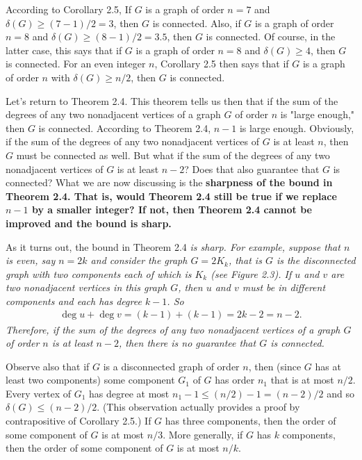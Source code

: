 According to Corollary 2.5, If $G$ is a graph of order $n = 7$ and $\delta(G) \geq (7-1)/2 = 3$, then $G$ is connected. Also, if $G$ is a graph of order $n=8$ and $\delta(G) \geq (8-1)/2 = 3.5$, then $G$ is connected. Of course, in the latter case, this says that if $G$ is a graph of order $n=8$ and $\delta(G) \geq 4$, then $G$ is connected. For an even integer $n$, Corollary 2.5 then says that if $G$ is a graph of order $n$ with $\delta(G) \geq n/2$, then $G$ is connected.

Let's return to Theorem 2.4. This theorem tells us then that if the sum of the degrees of any two nonadjacent vertices of a graph $G$ of order $n$ is "large enough," then $G$ is connected. According to Theorem 2.4, $n-1$ is large enough. Obviously, if the sum of the degrees of any two nonadjacent vertices of $G$ is at least $n$, then $G$ must be connected as well. But what if the sum of the degrees of any two nonadjacent vertices of $G$ is at least $n-2$? Does that also guarantee that $G$ is connected? What we are now discussing is the \bf{sharpness} of the bound in Theorem 2.4. That is, would Theorem 2.4 still be true if we replace $n-1$ by a smaller integer? If not, then Theorem 2.4 cannot be improved and the bound is sharp.

As it turns out, the bound in Theorem 2.4 \it{is} sharp. For example, suppose that $n$ is even, say $n=2k$ and consider the graph $G = 2K_{k}$, that is $G$ is the disconnected graph with two components each of which is $K_{k}$ (see Figure 2.3). If $u$ and $v$ are two nonadjacent vertices in this graph $G$, then $u$ and $v$ must be in different components and each has degree $k-1$. So
\begin{align*}
\deg{}{u}+\deg{}{v} = (k-1)+(k-1) = 2k-2 = n-2.
\end{align*}
Therefore, if the sum of the degrees of any two nonadjacent vertices of a graph $G$ of order $n$ is at least $n-2$, then there is no guarantee that $G$ is connected.



Observe also that if $G$ is a disconnected graph of order $n$, then (since $G$ has at least two components) some component $G_{1}$ of $G$ has order $n_{1}$ that is at most $n/2$. Every vertex of $G_{1}$ has degree at most $n_{1}-1 \leq (n/2)-1 = (n-2)/2$ and so $\delta(G) \leq (n-2)/2$. (This observation actually provides a proof by contrapositive of Corollary 2.5.) If $G$ has three components, then the order of some component of $G$ is at most $n/3$. More generally, if $G$ has $k$ components, then the order of some component of $G$ is at most $n/k$.

